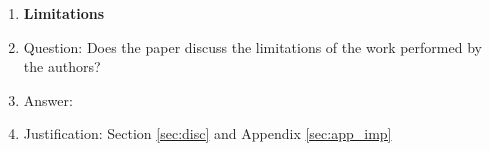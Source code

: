 \begin{enumerate}
\item {\bf Limitations}
    \item[] Question: Does the paper discuss the limitations of the work performed by the authors?
    \item[] Answer: \answerYes{} %
    \item[] Justification: Section \ref{sec:disc} and Appendix \ref{sec:app_imp}


\end{enumerate}
